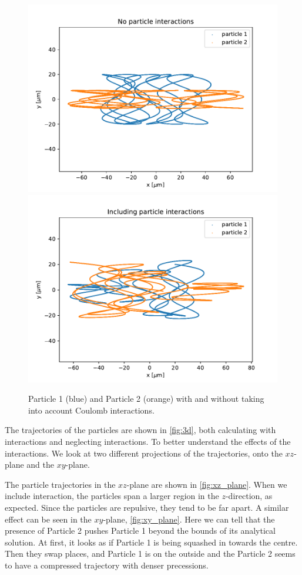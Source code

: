 \begin{figure}
\centering
\includegraphics[scale=0.7]{../figures/xz_plane_noint.pdf}
\includegraphics[scale=0.7]{../figures/xz_plane_int.pdf}
\caption{Particle 1 (blue) and Particle 2 (orange) with and without taking into account Coulomb interactions.}
\label{fig:xz_plane}
\end{figure}

The trajectories of the particles are shown in \autoref{fig:3d}, both calculating with interactions and
neglecting interactions. To better understand the effects of the interactions. We look at two
different projections of the trajectories, onto the $xz$-plane and the $xy$-plane.

The particle trajectories in the $xz$-plane are shown in \autoref{fig:xz_plane}. When we include interaction, the particles span a larger region in the $z$-direction, as expected. Since the particles
are repulsive, they tend to be far apart. A similar effect can be seen
in the $xy$-plane, \autoref{fig:xy_plane}. Here we can tell that the presence of Particle 2
pushes Particle 1 beyond the bounds of its analytical solution. At first, it looks as if Particle 1
is being squashed in towards the centre. Then they swap places, and Particle 1 is on the outside and the
Particle 2 seems to have a compressed trajectory with denser precessions.

